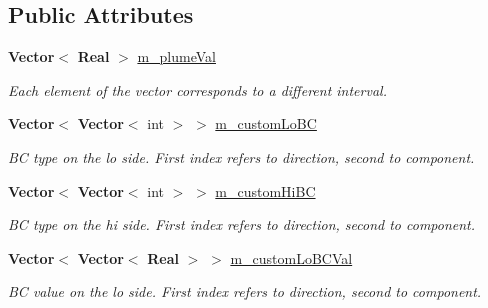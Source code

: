 \subsection*{Public Attributes}
\begin{DoxyCompactItemize}
\item 
\mbox{\label{class_advect_diffuse_scalar_b_c_a24079c63607fa7aaada70d393c91038e}} 
\textbf{ Vector}$<$ \textbf{ Real} $>$ \hyperlink{class_advect_diffuse_scalar_b_c_a24079c63607fa7aaada70d393c91038e}{m\+\_\+plume\+Val}
\begin{DoxyCompactList}\small\item\em Each element of the vector corresponds to a different interval. \end{DoxyCompactList}\item 
\mbox{\label{class_advect_diffuse_scalar_b_c_a88722dbb4d1fde30f3608db8104640c0}} 
\textbf{ Vector}$<$ \textbf{ Vector}$<$ int $>$ $>$ \hyperlink{class_advect_diffuse_scalar_b_c_a88722dbb4d1fde30f3608db8104640c0}{m\+\_\+custom\+Lo\+BC}
\begin{DoxyCompactList}\small\item\em BC type on the lo side. First index refers to direction, second to component. \end{DoxyCompactList}\item 
\mbox{\label{class_advect_diffuse_scalar_b_c_a3143ed8cc319ce90e64e936c459f9b12}} 
\textbf{ Vector}$<$ \textbf{ Vector}$<$ int $>$ $>$ \hyperlink{class_advect_diffuse_scalar_b_c_a3143ed8cc319ce90e64e936c459f9b12}{m\+\_\+custom\+Hi\+BC}
\begin{DoxyCompactList}\small\item\em BC type on the hi side. First index refers to direction, second to component. \end{DoxyCompactList}\item 
\mbox{\label{class_advect_diffuse_scalar_b_c_ab09adbfb8bbf7bd9ec9d51f2d0b1106a}} 
\textbf{ Vector}$<$ \textbf{ Vector}$<$ \textbf{ Real} $>$ $>$ \hyperlink{class_advect_diffuse_scalar_b_c_ab09adbfb8bbf7bd9ec9d51f2d0b1106a}{m\+\_\+custom\+Lo\+B\+C\+Val}
\begin{DoxyCompactList}\small\item\em BC value on the lo side. First index refers to direction, second to component. \end{DoxyCompactList}\item 

\end{DoxyCompactItemize}
